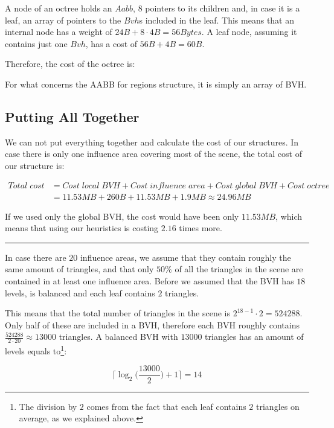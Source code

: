 \documentclass{PoliMi_MasterThesis}
\begin{document}
A node of an octree holds an $Aabb$, $8$ pointers to its children and, in case it is a leaf, an array of pointers to the $Bvh$s included in the leaf. This means that an internal node has a weight of $24B + 8 \cdot 4B = 56 Bytes$. A leaf node, assuming it contains just one $Bvh$, has a cost of $56B + 4B = 60B$.

Therefore, the cost of the octree is: 
\unboldmath

For what concerns the AABB for regions structure, it is simply an array of BVH.

\subsection*{Putting All Together}
We can not put everything together and calculate the cost of our structures. In case there is only one influence area covering most of the scene, the total cost of our structure is:

\begin{subequations}
	\begin{align*}
	Total\;cost &= Cost\;local\;BVH + Cost\;influence\;area + Cost\;global\;BVH + Cost\;octree\\
	&= 11.53MB + 260B + 11.53MB + 1.9MB \approx 24.96MB
	\end{align*}
\end{subequations}

If we used only the global BVH, the cost would have been only $11.53MB$, which means that using our heuristics is costing $2.16$ times more.

\noindent\rule{\textwidth}{1pt}
In case there are $20$ influence areas, we assume that they contain roughly the same amount of triangles, and that only $50\%$ of all the triangles in the scene are contained in at least one influence area. Before we assumed that the BVH has $18$ levels, is balanced and each leaf contains $2$ triangles. 

This means that the total number of triangles in the scene is $2^{18-1} \cdot 2 = 524288$. Only half of these are included in a BVH, therefore each BVH roughly contains $\frac{524288}{2\cdot 20} \approx 13000$ triangles. A balanced BVH with $13000$ triangles has an amount of levels equals to\footnote{The division by $2$ comes from the fact that each leaf contains $2$ triangles on average, as we explained above.}:

$$\Big\lceil\log_2\Big(\frac{13000}{2}\Big)+1\Big\rceil = 14$$ 
\end{document}
